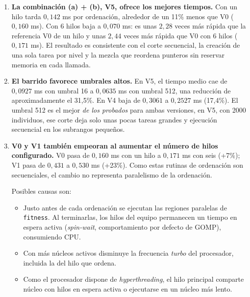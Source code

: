 \documentclass[12pt]{article}
\begin{document}
\begin{enumerate}
\begin{enumerate}
    \item \textbf{La combinación (a) + (b), V5, ofrece los mejores tiempos.} Con un hilo tarda $0,142$ ms por ordenación, alrededor de un 11\% menos que V0 ($0,160$ ms). Con 6 hilos baja a $0,070$ ms: es unas $2,28$ veces más rápida que la referencia V0 de un hilo y unas $2,44$ veces más rápida que V0 con 6 hilos ($0,171$ ms). El resultado es consistente con el corte secuencial, la creación de una sola tarea por nivel y la mezcla que reordena punteros sin reservar memoria en cada llamada.
 
    \item \textbf{El barrido favorece umbrales altos.} En V5, el tiempo medio cae 
    de $0,0927$ ms con umbral 16 a $0,0635$ ms con umbral 512, una reducción de 
    aproximadamente el 31,5\%. En V4 baja de $0,3061$ a $0,2527$ ms (17,4\%).
     El umbral 512 es el mejor \emph{de los probados} para ambas versiones, en V5,
      con 2000 individuos, ese corte deja solo unas pocas tareas grandes y ejecución 
      secuencial en los subrangos pequeños.
 
    \item \textbf{V0 y V1 también empeoran al aumentar el número de hilos configurado.} V0 pasa de $0,160$ ms
     con un hilo a $0,171$ ms con seis (+7\%); V1 pasa de $0,431$ a $0,530$ ms (+23\%). Como estas rutinas de
      ordenación son secuenciales, el cambio no representa paralelismo de la ordenación. 
      

















      
      Posibles causas son: 

          \begin{itemize}
        \item Justo antes de cada ordenación se ejecutan las regiones paralelas
         de \texttt{fitness}. Al terminarlas, los hilos del equipo permanecen un
          tiempo en espera activa (\textit{spin-wait}, comportamiento por defecto de GOMP), consumiendo CPU.
        \item Con más núcleos activos disminuye la frecuencia \textit{turbo} del procesador, incluida la del hilo que ordena.
        \item Como el procesador dispone de \textit{hyperthreading}, el hilo principal 
        comparte núcleo con hilos en espera activa o ejecutarse en un núcleo más lento.
    \end{itemize}



\end{enumerate}
\end{enumerate}
\end{document}
